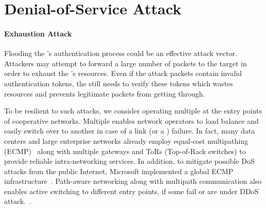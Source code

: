 
\section{Denial-of-Service Attack}
\label{sec:disrupting}

\paragraph{Exhaustion Attack}
Flooding the \tp's authentication process could be an effective attack vector. Attackers
may attempt to forward a large number of packets to the target \tp in order to exhaust the
\tp's resources. Even if the attack packets contain invalid authentication tokens, the \tp still
needs to verify these tokens which wastes resources and prevents legitimate packets from getting through.

To be resilient to such attacks, we consider operating multiple \tps at the entry points
of cooperative networks. Multiple \tps enables network operators
to load balance and easily switch over to another \tp in case of a link (or a \tp)
failure. In fact, many data centers and large enterprise networks already employ equal-cost
multipathing (ECMP)~\cite{rfc2991,rfc2992} along with multiple gateways and ToRs (Top-of-Rack
switches) to provide reliable intra-networking services. In addition, to mitigate possible DoS
attacks from the public Internet, Microsoft implemented a global ECMP
infrastructure~\cite{ms2020ecmp}. Path-aware networking along with multipath communication
also enables active switching to different entry points, if some fail or are under DDoS attack.~\cite{Dawkins2018,Trammell2018}.



